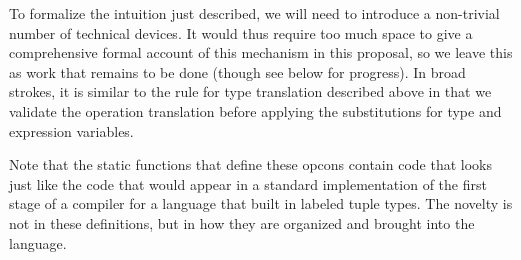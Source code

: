 
To formalize the intuition just described, we will need to introduce a non-trivial number of technical devices. It would thus require too much space to give a comprehensive formal account of this mechanism in this proposal, so  we leave this as work that remains to be done (though see below for progress). In broad strokes, it is similar to the rule for type translation described above in that we validate the operation translation before applying the substitutions for type and expression variables.

Note that the static functions that define these opcons contain code that looks just like the code that would appear in a standard implementation of the first stage of a compiler for a language that built in labeled tuple types. The novelty is not in these definitions, but in how they are organized and brought into the language.

